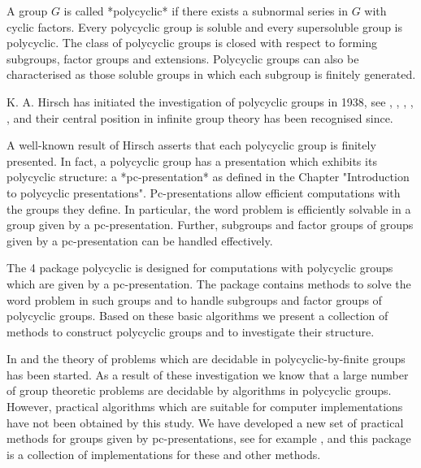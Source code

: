 

A group $G$ is called *polycyclic* if there exists a subnormal series
in $G$ with cyclic factors.  Every polycyclic group is soluble and
every supersoluble group is polycyclic.  The class of polycyclic
groups is closed with respect to forming subgroups, factor groups and
extensions. Polycyclic groups can also be characterised as those
soluble groups in which each subgroup is finitely generated.

K. A. Hirsch  has initiated the investigation of  polycyclic groups in
1938,  see \cite{Hir38b},  \cite{Hir38a},  \cite{Hir46}, \cite{Hir52},
\cite{Hir54}, and their central  position in infinite group theory has
been recognised since.

A well-known result of Hirsch asserts that each polycyclic group is
finitely presented. In fact, a polycyclic group has a presentation
which exhibits its polycyclic structure: a *pc-presentation* as defined 
in the Chapter "Introduction to polycyclic presentations". Pc-presentations 
allow efficient computations with the groups they define. In particular, 
the word problem is efficiently solvable in a group given by a
pc-presentation. Further, subgroups and factor groups of groups given
by a pc-presentation can be handled effectively.

The {\GAP} 4 package {\sf polycyclic} is designed for computations
with polycyclic groups which are given by a pc-presentation.  The
package contains methods to solve the word problem in such groups and
to handle subgroups and factor groups of polycyclic groups. Based on
these basic algorithms we present a collection of methods to construct
polycyclic groups and to investigate their structure.

In \cite{BCRS91} and \cite{Seg90} the theory of problems which are 
decidable in polycyclic-by-finite groups has been started. As a result 
of these investigation we know that a large number of group theoretic 
problems are decidable by algorithms in polycyclic groups. However, 
practical algorithms which are suitable for computer implementations
have not been obtained by this study. We have developed a new set of
practical methods for groups given by pc-presentations, see for example
\cite{Eic00}, and this package is a collection of implementations for these 
and other methods. 

